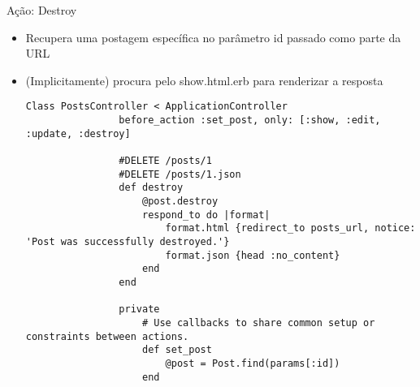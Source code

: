 \begin{frame}{Ação: Destroy}
	\begin{itemize}
		\item Recupera uma postagem específica no parâmetro \alert{id} passado como parte da URL
		\item (Implicitamente) procura pelo \alert{show.html.erb} para renderizar a resposta
		\begin{lstlisting}[style=RubyInputStyle, caption=posts_controller.rb]
			Class PostsController < ApplicationController
				before_action :set_post, only: [:show, :edit, :update, :destroy]
				
				#DELETE /posts/1
				#DELETE /posts/1.json 
				def destroy
					@post.destroy
					respond_to do |format|
						format.html {redirect_to posts_url, notice: 'Post was successfully destroyed.'} 
						format.json {head :no_content}
					end
				end 
				
				private
					# Use callbacks to share common setup or constraints between actions.
					def set_post 
						@post = Post.find(params[:id])
					end 
		\end{lstlisting}		
	\end{itemize}	
\end{frame}